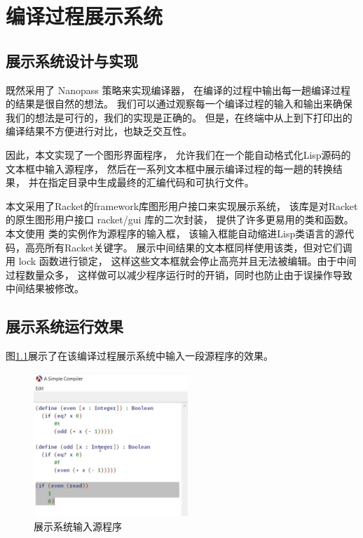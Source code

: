 
\chapter{编译过程展示系统}

\section{展示系统设计与实现}

既然采用了 Nanopass 策略来实现编译器，
在编译的过程中输出每一趟编译过程的结果是很自然的想法。
我们可以通过观察每一个编译过程的输入和输出来确保我们的想法是可行的，我们的实现是正确的。
但是，在终端中从上到下打印出的编译结果不方便进行对比，也缺乏交互性。

因此，本文实现了一个图形界面程序，
允许我们在一个能自动格式化Lisp源码的文本框中输入源程序，
然后在一系列文本框中展示编译过程的每一趟的转换结果，
并在指定目录中生成最终的汇编代码和可执行文件。

本文采用了Racket的framework库图形用户接口来实现展示系统，
该库是对Racket的原生图形用户接口 racket/gui 库的二次封装，
提供了许多更易用的类和函数。
本文使用  类的实例作为源程序的输入框，
该输入框能自动缩进Lisp类语言的源代码，高亮所有Racket关键字。
展示中间结果的文本框同样使用该类，但对它们调用 lock 函数进行锁定，
这样这些文本框就会停止高亮并且无法被编辑。由于中间过程数量众多，
这样做可以减少程序运行时的开销，同时也防止由于误操作导致中间结果被修改。

\section{展示系统运行效果}

图\ref{fig:gui-init}展示了在该编译过程展示系统中输入一段源程序的效果。
\begin{figure}[h]
\centering
\includegraphics[width=0.52\textwidth]{figures/gui-init2.png}
\caption{展示系统输入源程序}
\label{fig:gui-init}
\end{figure}

